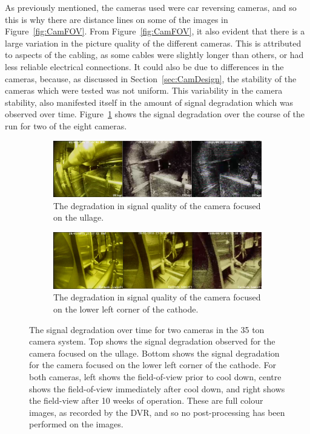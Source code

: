 As previously mentioned, the cameras used were car reversing cameras, and so this is why there are distance lines on some of the images in Figure~\ref{fig:CamFOV}. From Figure~\ref{fig:CamFOV}, it also evident that there is a large variation in the picture quality of the different cameras. This is attributed to aspects of the cabling, as some cables were slightly longer than others, or had less reliable electrical connections. It could also be due to differences in the cameras, because, as discussed in Section~\ref{sec:CamDesign}, the stability of the cameras which were tested was not uniform. This variability in the camera stability, also manifested itself in the amount of signal degradation which was observed over time. Figure~\ref{fig:CamSigDeg} shows the signal degradation over the course of the run for two of the eight cameras. \\

\begin{figure}
  \centering
  \begin{subfigure}{0.95\textwidth}
    \centering
    \includegraphics[width=\textwidth]{Cam1degradation2}
    \caption{The degradation in signal quality of the camera focused on the ullage.}
  \end{subfigure}
  \begin{subfigure}{0.95\textwidth}
    \centering
    \includegraphics[width=\textwidth]{Cam4degradation2}
    \caption{The degradation in signal quality of the camera focused on the lower left corner of the cathode.}
  \end{subfigure}
  \caption[The signal degradation over time for two cameras in the 35 ton camera system]
          {The signal degradation over time for two cameras in the 35 ton camera system. Top shows the signal degradation observed for the camera focused on the ullage. Bottom shows the signal degradation for the camera focused on the lower left corner of the cathode. For both cameras, left shows the field-of-view prior to cool down, centre shows the field-of-view immediately after cool down, and right shows the field-view after 10 weeks of operation. These are full colour images, as recorded by the DVR, and so no post-processing has been performed on the images.}  
  \label{fig:CamSigDeg}
\end{figure}

